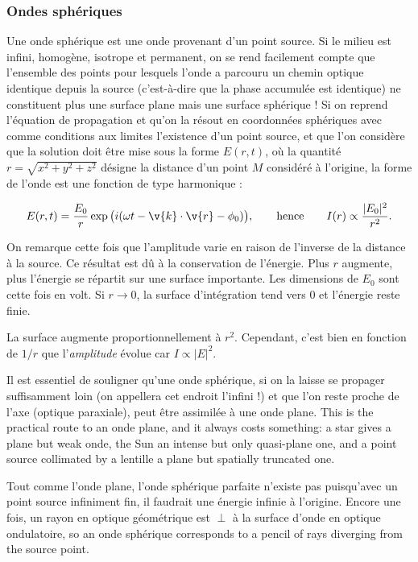 \subsubsection{Ondes sphériques}

Une onde sphérique est une onde provenant d'un point source. Si le milieu est
infini, homogène, isotrope et permanent, on se rend facilement compte que
l'ensemble des points pour lesquels l'onde a parcouru un chemin optique
identique depuis la source (c'est-à-dire que la phase accumulée est identique)
ne constituent plus une surface plane mais une surface sphérique ! Si on reprend
l'équation de propagation et qu'on la résout en coordonnées sphériques avec comme
conditions aux limites l'existence d'un point source, et que l'on considère que
la solution doit être mise sous la forme $E(r,t)$, où la quantité
$r=\sqrt{x^2+y^2+z^2}$ désigne la distance d'un point $M$ considéré à l'origine,
la forme de l'onde est une fonction de type harmonique :

\[
  E(r,t)=\frac{E_0}{r}\exp\big(i(\omega t-\v{k}\cdot\v{r}-\phi_0)\big),
  \qquad\text{hence}\qquad I(r)\propto\frac{|E_0|^2}{r^2}.
\]

On remarque cette fois que l'amplitude varie en raison de l'inverse de la
distance à la source. Ce résultat est dû à la conservation de l'énergie. Plus $r$
augmente, plus l'énergie se répartit sur une surface importante. Les dimensions
de $E_0$ sont cette fois en volt. Si $r\to 0$, la surface d'intégration tend
vers 0 et l'énergie reste finie.

\begin{remark}
  La surface augmente proportionnellement à $r^2$. Cependant, c'est bien en
  fonction de $1/r$ que l'\emph{amplitude} évolue car $I\propto|E|^2$.
\end{remark}

\begin{remark}
  Il est essentiel de souligner qu'une onde sphérique, si on la laisse se
  propager suffisamment loin (on appellera cet endroit l'infini !) et que l'on
  reste proche de l'axe (optique paraxiale), peut être assimilée à une onde
  plane. This is the practical route to an onde plane, and it always costs
  something: a star gives a plane but weak onde, the Sun an intense but only
  quasi-plane one, and a point source collimated by a lentille a plane but
  spatially truncated one.
\end{remark}

Tout comme l'onde plane, l'onde sphérique parfaite n'existe pas puisqu'avec un
point source infiniment fin, il faudrait une énergie infinie à l'origine. Encore
une fois, un rayon en optique géométrique est $\perp$ à la surface d'onde en
optique ondulatoire, so an onde sphérique corresponds to a pencil of rays
diverging from the source point.

